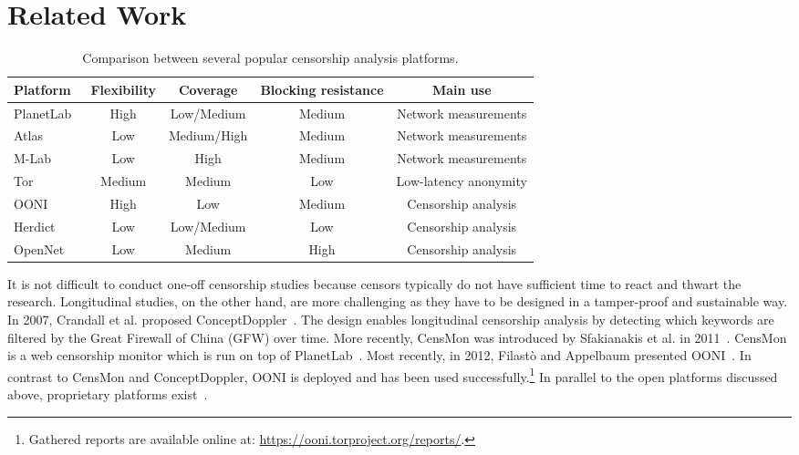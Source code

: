 \section{Related Work}
\label{related_work}
\begin{table*}[ht!]
\centering
\begin{tabular}{l|cccc}
\textbf{Platform} & \textbf{Flexibility} & \textbf{Coverage} &
\textbf{Blocking resistance} & \textbf{Main use} \\
\hline 
PlanetLab~\cite{planetlab} & High & Low/Medium & Medium & Network measurements \\
Atlas~\cite{atlas} & Low & Medium/High & Medium & Network measurements \\
M-Lab~\cite{dovrolis2010measurement} & Low & High & Medium & Network measurements \\
Tor~\cite{Dingledine2004} & Medium & Medium & Low & Low-latency anonymity \\
OONI~\cite{Filasto2012} & High & Low & Medium & Censorship analysis \\
Herdict~\cite{Herdict} & Low & Low/Medium & Low & Censorship analysis \\
OpenNet~\cite{opennet} & Low & Medium & High & Censorship analysis \\
\hline 
\end{tabular} 
\caption{Comparison between several popular censorship analysis platforms.}
\label{tab:comparison}
\end{table*}

It is not difficult to conduct one-off censorship studies because censors
typically do not have sufficient time to react and thwart the research.
Longitudinal studies, on the other hand, are more challenging as they have to
be designed in a tamper-proof and sustainable way.  In 2007, Crandall et al.
proposed ConceptDoppler~\cite{Crandall2007}.  The design enables longitudinal
censorship analysis by detecting which keywords are filtered by the Great
Firewall of China (GFW) over time.  More recently, CensMon was introduced by
Sfakianakis et al. in 2011~\cite{Sfakianakis2011}.  CensMon is a web censorship
monitor which is run on top of PlanetLab~\cite{planetlab}.  Most recently, in
2012, Filast\`{o} and Appelbaum presented OONI~\cite{Filasto2012}.  In
contrast to CensMon and ConceptDoppler, OONI is deployed and has been used
successfully.\footnote{Gathered reports are available online at:
\url{https://ooni.torproject.org/reports/}.}  In parallel to the open platforms
discussed above, proprietary platforms exist~\cite{hwang2007herdict,opennet}.


